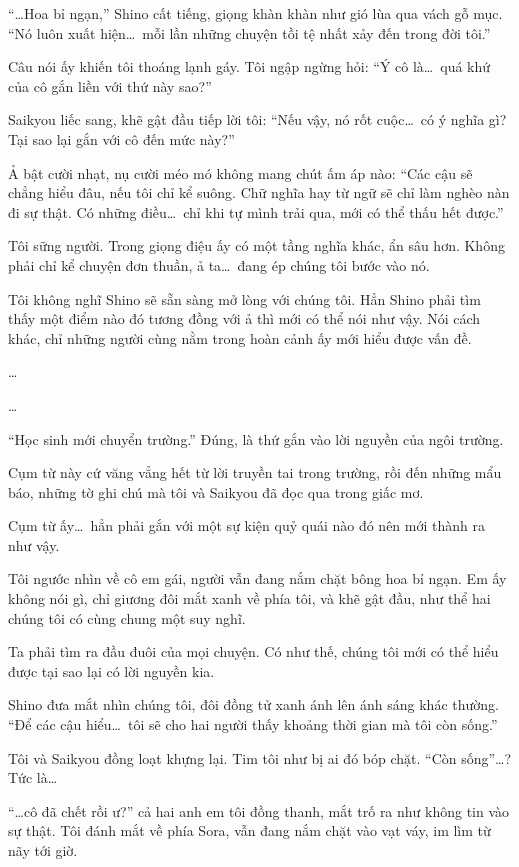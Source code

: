 \documentclass[../main.tex]{subfiles}
\begin{document}
``\dots Hoa bỉ ngạn,'' Shino cất tiếng, giọng khàn khàn như gió lùa qua vách gỗ mục. ``Nó luôn xuất hiện\dots\ mỗi lần những chuyện tồi tệ nhất xảy đến trong đời tôi.''

Câu nói ấy khiến tôi thoáng lạnh gáy. Tôi ngập ngừng hỏi: ``Ý cô là\dots\ quá khứ của cô gắn liền với thứ này sao?''

Saikyou liếc sang, khẽ gật đầu tiếp lời tôi: ``Nếu vậy, nó rốt cuộc\dots\ có ý nghĩa gì? Tại sao lại gắn với cô đến mức này?''

Ả bật cười nhạt, nụ cười méo mó không mang chút ấm áp nào: ``Các cậu sẽ chẳng hiểu đâu, nếu tôi chỉ kể suông. Chữ nghĩa hay từ ngữ sẽ chỉ làm nghèo nàn đi sự thật. Có những điều\dots\ chỉ khi tự mình trải qua, mới có thể thấu hết được.''

Tôi sững người. Trong giọng điệu ấy có một tầng nghĩa khác, ẩn sâu hơn. Không phải chỉ kể chuyện đơn thuần, ả ta\dots\ đang ép chúng tôi bước vào nó.

Tôi không nghĩ Shino sẽ sẵn sàng mở lòng với chúng tôi. Hẳn Shino phải tìm thấy một điểm nào đó tương đồng với ả thì mới có thể nói như vậy. Nói cách khác, chỉ những người cùng nằm trong hoàn cảnh ấy mới hiểu được vấn đề.

\dots

\dots

``Học sinh mới chuyển trường.'' Đúng, là thứ gắn vào lời nguyền của ngôi trường.

Cụm từ này cứ văng vẳng hết từ lời truyền tai trong trường, rồi đến những mẩu báo, những tờ ghi chú mà tôi và Saikyou đã đọc qua trong giấc mơ.

Cụm từ ấy\dots\ hẳn phải gắn với một sự kiện quỷ quái nào đó nên mới thành ra như vậy.

Tôi ngước nhìn về cô em gái, người vẫn đang nắm chặt bông hoa bỉ ngạn. Em ấy không nói gì, chỉ giương đôi mắt xanh về phía tôi, và khẽ gật đầu, như thể hai chúng tôi có cùng chung một suy nghĩ.

Ta phải tìm ra đầu đuôi của mọi chuyện. Có như thế, chúng tôi mới có thể hiểu được tại sao lại có lời nguyền kia.

Shino đưa mắt nhìn chúng tôi, đôi đồng tử xanh ánh lên ánh sáng khác thường. ``Để các cậu hiểu\dots\ tôi sẽ cho hai người thấy khoảng thời gian mà tôi còn sống.''

Tôi và Saikyou đồng loạt khựng lại. Tim tôi như bị ai đó bóp chặt. ``Còn sống''\dots? Tức là\dots

``\dots cô đã chết rồi ư?'' cả hai anh em tôi đồng thanh, mắt trố ra như không tin vào sự thật. Tôi đánh mắt về phía Sora, vẫn đang nắm chặt vào vạt váy, im lìm từ nãy tới giờ.
\end{document}
